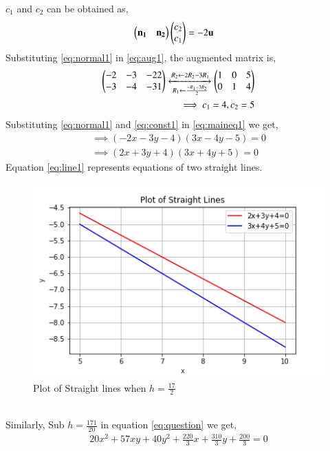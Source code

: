 \documentclass[journal,12pt,twocolumn]{IEEEtran}
\begin{document}
$c_1$ and $c_2$ can be obtained as,
\begin{align}
\begin{pmatrix}\mathbf{n_1} & \mathbf{n_2}\end{pmatrix}\begin{pmatrix}c_2\\c_1\end{pmatrix}&=-2\mathbf{u} \label{eq:aug1}
\end{align}
Substituting \eqref{eq:normal1} in \eqref{eq:aug1}, the augmented matrix is,
\begin{align}
\begin{pmatrix}-2 & -3 & -22 \\ -3 & -4 & -31\end{pmatrix}
\xleftrightarrow[R_1\leftarrow \frac{-R_1-3R_2}{2}]{R_2\leftarrow 2R_2-3R_1}
\begin{pmatrix}1 &0 &5 \\ 0& 1 & 4\end{pmatrix} \label{eq:aug2}\\
\implies c_1 = 4, c_2=5 \label{eq:const1}
\end{align}
Substituting \eqref{eq:normal1} and \eqref{eq:const1} in \eqref{eq:maineq1} we get,
\begin{multline}
\implies (-2x-3y-4)(3x-4y-5) = 0\\
\implies \boxed{(2x+3y+4)(3x+4y+5) = 0} \label{eq:line1}
\end{multline}
Equation \eqref{eq:line1} represents equations of two straight lines.\\
\renewcommand{\thefigure}{\arabic{figure}}
\begin{figure}[h!]
	\centering
	\includegraphics[width=\columnwidth]{st1.png}
	\caption{Plot of Straight lines when $h=\frac{17}{2}$}
	\label{myfig}
\end{figure}\\








Similarly, Sub $h=\frac{171}{20}$ in equation \eqref{eq:question} we get,
\begin{align}
20x^2+57xy+40y^2+\frac{220}{3}x+\frac{310}{3}y+\frac{200}{3}=0 \label{eq:op2}
\end{align}
\end{document}
